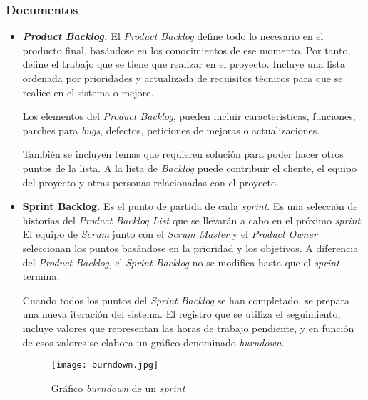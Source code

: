 \subsubsection{Documentos}
\begin{itemize}
\item \textbf{\textit{Product Backlog.}} El \textit{Product Backlog} define todo lo necesario en el producto final, basándose en los conocimientos de ese momento. Por tanto, define el trabajo que se tiene que realizar en el proyecto. Incluye una lista ordenada por prioridades y actualizada de requisitos técnicos para que se realice en  el sistema o mejore. 

Los elementos del \textit{Product Backlog}, pueden incluir características, funciones, parches para \textit{bugs}, defectos, peticiones de mejoras o actualizaciones.
 
También se incluyen temas que requieren solución para poder hacer otros puntos de la lista. A la lista de \textit{Backlog} puede contribuir el cliente, el equipo del proyecto y otras personas relacionadas con el proyecto.

\item \textbf{Sprint Backlog.} Es el punto de partida de cada \textit{sprint}. Es una selección de historias del \textit{Product Backlog List} que se llevarán a cabo en el próximo \textit{sprint}. El equipo de \textit{Scrum} junto con el \textit{Scrum Master} y el \textit{Product Owner} seleccionan los puntos basándose en la prioridad y los objetivos. A diferencia del \textit{Product Backlog}, el \textit{Sprint Backlog} no se modifica hasta que el \textit{sprint} termina.
 
Cuando todos los puntos del \textit{Sprint Backlog} se han completado, se prepara una nueva iteración del sistema. El registro que se utiliza el seguimiento, incluye valores que representan las horas de trabajo pendiente, y en función de esos valores se elabora un gráfico denominado \textit{burndown}.

\begin{figure}[h] 
  \centering
  \texttt{[image: burndown.jpg]}
  \caption{Gráfico \textit{burndown} de un \textit{sprint}}
  \label{fig:burndown}
\end{figure}

\end{itemize}

